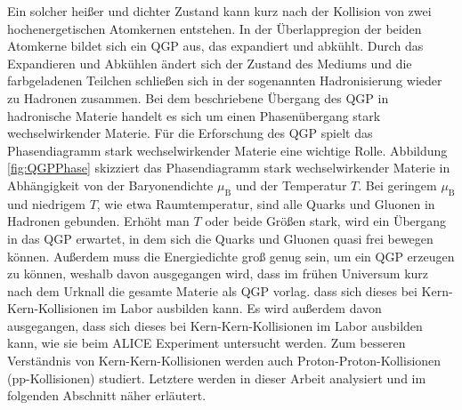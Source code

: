 \newline
Ein solcher heißer und dichter Zustand kann kurz nach der Kollision von zwei hochenergetischen Atomkernen entstehen.
In der Überlappregion der beiden Atomkerne bildet sich ein QGP aus, das expandiert und abkühlt.
Durch das Expandieren und Abkühlen ändert sich der Zustand des Mediums und die farbgeladenen Teilchen schließen sich in der sogenannten Hadronisierung wieder zu Hadronen zusammen.
Bei dem beschriebene Übergang des QGP in hadronische Materie handelt es sich um einen Phasenübergang stark wechselwirkender Materie.
\newline
Für die Erforschung des QGP spielt das Phasendiagramm stark wechselwirkender Materie eine wichtige Rolle.
Abbildung \ref{fig:QGPPhase} skizziert das Phasendiagramm stark wechselwirkender Materie in Abhängigkeit von der Baryonendichte $\mu_{\text{B}}$ und der Temperatur $T$.
Bei geringem $\mu_{\text{B}}$ und niedrigem $T$, wie etwa Raumtemperatur, sind alle Quarks und Gluonen in Hadronen gebunden.
Erhöht man $T$ oder beide Größen stark, wird ein Übergang in das QGP erwartet, in dem sich die Quarks und Gluonen quasi frei bewegen können.
Außerdem muss die Energiedichte groß genug sein, um ein QGP erzeugen zu können, weshalb davon ausgegangen wird, dass im frühen Universum kurz nach dem Urknall die gesamte Materie als QGP vorlag. 
dass sich dieses bei Kern-Kern-Kollisionen im Labor ausbilden kann.
Es wird außerdem davon ausgegangen, dass sich dieses bei Kern-Kern-Kollisionen im Labor ausbilden kann, wie sie beim ALICE Experiment untersucht werden.
\newline
Zum besseren Verständnis von Kern-Kern-Kollisionen werden auch Proton-Proton-Kollisionen (pp-Kollisionen) studiert.
Letztere werden in dieser Arbeit analysiert und im folgenden Abschnitt näher erläutert.